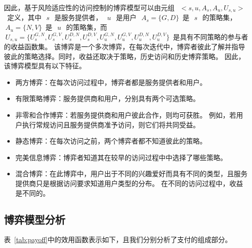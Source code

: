 因此，基于风险适应性的访问控制的博弈模型可以由元组~$~<s,u,A_s,A_u,U_{s,u}>~$~定义，其中~$~s~$~是服务提供者，~$~u~$~是用户~$~A_s=\{G,D\}$~是~$~s~$~的策略集，~$~A_u=\{N,V\}$~是~$~u~$~的策略集，而~$~U_{s,u}=\{U_s^{G,N}, U_s^{G,V}, U_s^{D,N}, U_s^{D,V}, U_u^{G,N}, U_u^{G,V}, U_u^{D,N}, U_u^{D,V}\}$~是具有不同策略的参与者的收益函数集。 该博弈是一个多次博弈，在每次迭代中，博弈者彼此了解并指导彼此的策略选择。同时，收益还取决于策略，历史访问和历史博弈策略。 因此，该博弈模型具有以下特征。
\begin{itemize}
	\item 两方博弈：在每次访问过程中，博弈者都是服务提供者和用户。
	\item 有限策略博弈：服务提供商和用户，分别具有两个可选策略。
	\item 非零和合作博弈：若服务提供商和用户彼此合作，则均可获胜。 例如，若用户执行常规访问且服务提供商准予访问，则它们将共同受益。
	\item 静态博弈：在每次访问之前，两个博弈者都不知道彼此的策略。
	\item 完美信息博弈：博弈者知道其在较早的访问过程中中选择了哪些策略。
	\item 混合博弈：在此博弈中，用户出于不同的兴趣爱好而具有不同的类型，且服务提供商只是根据访问要求知道用户类型的分布。 在不同的访问过程中，收益是不同的。
\end{itemize}

\subsection{博弈模型分析}

表~\ref{tab:payoff}中的效用函数表示如下，且我们分别分析了支付的组成部分。


